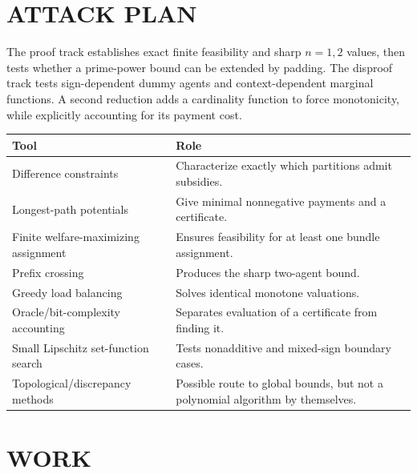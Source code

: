 \documentclass[11pt,a4paper]{article}
\theoremstyle{remark}\newtheorem{remark}[theorem]{Remark}
\begin{document}
\section{ATTACK PLAN}
The proof track establishes exact finite feasibility and sharp $n=1,2$ values, then tests whether a prime-power bound can be extended by padding. The disproof track tests sign-dependent dummy agents and context-dependent marginal functions. A second reduction adds a cardinality function to force monotonicity, while explicitly accounting for its payment cost.

\begin{center}\begin{tabular}{p{.25\linewidth}p{.66\linewidth}}\toprule Tool&Role\\\midrule
Difference constraints&Characterize exactly which partitions admit subsidies.\\
Longest-path potentials&Give minimal nonnegative payments and a certificate.\\
Finite welfare-maximizing assignment&Ensures feasibility for at least one bundle assignment.\\
Prefix crossing&Produces the sharp two-agent bound.\\
Greedy load balancing&Solves identical monotone valuations.\\
Oracle/bit-complexity accounting&Separates evaluation of a certificate from finding it.\\
Small Lipschitz set-function search&Tests nonadditive and mixed-sign boundary cases.\\
Topological/discrepancy methods&Possible route to global bounds, but not a polynomial algorithm by themselves.\\\bottomrule\end{tabular}\end{center}

\section{WORK}
\end{document}
